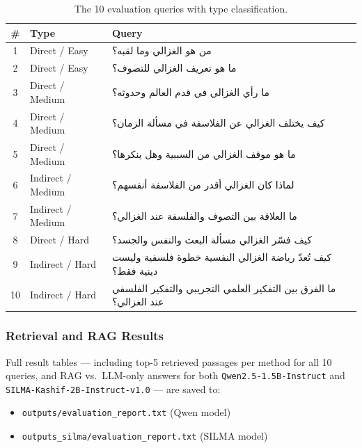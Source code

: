 \begin{table}[H]
  \centering
  \caption{The 10 evaluation queries with type classification.}
  \label{tab:queries}
  \renewcommand{\arraystretch}{1.35}
  \begin{tabularx}{\textwidth}{c l X}
    \toprule
    \textbf{\#} & \textbf{Type} & \textbf{Query} \\
    \midrule
    1  & Direct / Easy    & \textarabic{من هو الغزالي وما لقبه؟} \\
    2  & Direct / Easy    & \textarabic{ما هو تعريف الغزالي للتصوف؟} \\
    3  & Direct / Medium  & \textarabic{ما رأي الغزالي في قدم العالم وحدوثه؟} \\
    4  & Direct / Medium  & \textarabic{كيف يختلف الغزالي عن الفلاسفة في مسألة الزمان؟} \\
    5  & Direct / Medium  & \textarabic{ما هو موقف الغزالي من السببية وهل ينكرها؟} \\
    6  & Indirect / Medium & \textarabic{لماذا كان الغزالي أقدر من الفلاسفة أنفسهم؟} \\
    7  & Indirect / Medium & \textarabic{ما العلاقة بين التصوف والفلسفة عند الغزالي؟} \\
    8  & Direct / Hard    & \textarabic{كيف فسّر الغزالي مسألة البعث والنفس والجسد؟} \\
    9  & Indirect / Hard  & \textarabic{كيف تُعدّ رياضة الغزالي النفسية خطوة فلسفية وليست دينية فقط؟} \\
    10 & Indirect / Hard  & \textarabic{ما الفرق بين التفكير العلمي التجريبي والتفكير الفلسفي عند الغزالي؟} \\
    \bottomrule
  \end{tabularx}
\end{table}

\subsubsection{Retrieval and RAG Results}

Full result tables --- including top-5 retrieved passages per method for all 10 queries, and RAG vs.\ LLM-only answers for both \texttt{Qwen2.5-1.5B-Instruct} and \texttt{SILMA-Kashif-2B-Instruct-v1.0} --- are saved to:

\begin{itemize}
  \item \texttt{outputs/evaluation\_report.txt} (Qwen model)
  \item \texttt{outputs\_silma/evaluation\_report.txt} (SILMA model)
\end{itemize}

